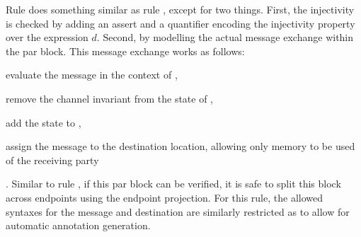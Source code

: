 Rule  does something similar as rule , except for two things. First, the injectivity is checked by adding an assert and a quantifier encoding the injectivity property over the expression $d$. Second, by modelling the actual message exchange within the par block. This message exchange works as follows: \begin{enumerate*}\item evaluate the message in the context of \kwfi{}, \item remove the channel invariant from the state of \kwfi{}, \item add the state to , \item  assign the message to the destination location, allowing only memory to be used of the receiving party\end{enumerate*}. Similar to rule , if this par block can be verified, it is safe to split this block across endpoints using the endpoint projection. For this rule, the allowed syntaxes for the message and destination are similarly restricted as  to allow for automatic annotation generation.